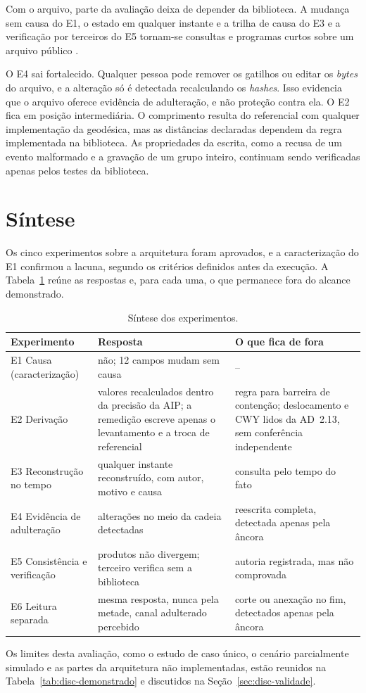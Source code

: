 Com o arquivo, parte da avaliação deixa de depender da biblioteca. A mudança sem causa do E1, o estado em qualquer instante e a trilha de causa do E3 e a verificação por terceiros do E5 tornam-se consultas e programas curtos sobre um arquivo público \cite{aeroledger_dataset}.

O E4 sai fortalecido. Qualquer pessoa pode remover os gatilhos ou editar os \textit{bytes} do arquivo, e a alteração só é detectada recalculando os \textit{hashes}. Isso evidencia que o arquivo oferece evidência de adulteração, e não proteção contra ela. O E2 fica em posição intermediária. O comprimento resulta do referencial com qualquer implementação da geodésica, mas as distâncias declaradas dependem da regra implementada na biblioteca. As propriedades da escrita, como a recusa de um evento malformado e a gravação de um grupo inteiro, continuam sendo verificadas apenas pelos testes da biblioteca.

\section{Síntese}\label{sec:res-sintese}

Os cinco experimentos sobre a arquitetura foram aprovados, e a caracterização do E1 confirmou a lacuna, segundo os critérios definidos antes da execução. A Tabela~\ref{tab:res-sintese} reúne as respostas e, para cada uma, o que permanece fora do alcance demonstrado.

\begin{table}[htbp]
    \centering
    \caption{Síntese dos experimentos.}
    \label{tab:res-sintese}
    \begin{tabularx}{\linewidth}{l X X}
        \toprule
        Experimento & Resposta & O que fica de fora \\
        \midrule
        E1 Causa (caracterização) & não; 12 campos mudam sem causa & -- \\
        E2 Derivação & valores recalculados dentro da precisão da AIP; a remedição escreve apenas o levantamento e a troca de referencial & regra para barreira de contenção; deslocamento e CWY lidos da AD~2.13, sem conferência independente \\
        E3 Reconstrução no tempo & qualquer instante reconstruído, com autor, motivo e causa & consulta pelo tempo do fato \\
        E4 Evidência de adulteração & alterações no meio da cadeia detectadas & reescrita completa, detectada apenas pela âncora \\
        E5 Consistência e verificação & produtos não divergem; terceiro verifica sem a biblioteca & autoria registrada, mas não comprovada \\
        E6 Leitura separada & mesma resposta, nunca pela metade, canal adulterado percebido & corte ou anexação no fim, detectados apenas pela âncora \\
        \bottomrule
    \end{tabularx}
    \par{}
\end{table}

Os limites desta avaliação, como o estudo de caso único, o cenário parcialmente simulado e as partes da arquitetura não implementadas, estão reunidos na Tabela~\ref{tab:disc-demonstrado} e discutidos na Seção~\ref{sec:disc-validade}.

